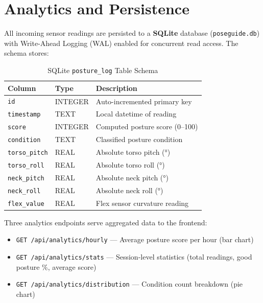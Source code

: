 \documentclass[12pt,a4paper]{report}
\newcommand{\code}[1]{\texttt{\small\color{accentviolet}#1}}
\begin{document}
\section{Analytics and Persistence}

All incoming sensor readings are persisted to a \textbf{SQLite} database (\code{poseguide.db}) with Write-Ahead Logging (WAL) enabled for concurrent read access. The schema stores:

\begin{table}[H]
\centering
\caption{SQLite \texttt{posture\_log} Table Schema}
\label{tab:schema}
\begin{tabularx}{\columnwidth}{llX}
\toprule
\textbf{Column} & \textbf{Type} & \textbf{Description} \\
\midrule
\code{id}          & INTEGER   & Auto-incremented primary key \\
\code{timestamp}   & TEXT      & Local datetime of reading \\
\code{score}       & INTEGER   & Computed posture score (0--100) \\
\code{condition}   & TEXT      & Classified posture condition \\
\code{torso\_pitch}& REAL      & Absolute torso pitch (°) \\
\code{torso\_roll} & REAL      & Absolute torso roll (°) \\
\code{neck\_pitch} & REAL      & Absolute neck pitch (°) \\
\code{neck\_roll}  & REAL      & Absolute neck roll (°) \\
\code{flex\_value} & REAL      & Flex sensor curvature reading \\
\bottomrule
\end{tabularx}
\end{table}

Three analytics endpoints serve aggregated data to the frontend:
\begin{itemize}[leftmargin=2em]
    \item \code{GET /api/analytics/hourly} — Average posture score per hour (bar chart)
    \item \code{GET /api/analytics/stats} — Session-level statistics (total readings, good posture \%, average score)
    \item \code{GET /api/analytics/distribution} — Condition count breakdown (pie chart)
\end{itemize}


\end{document}
